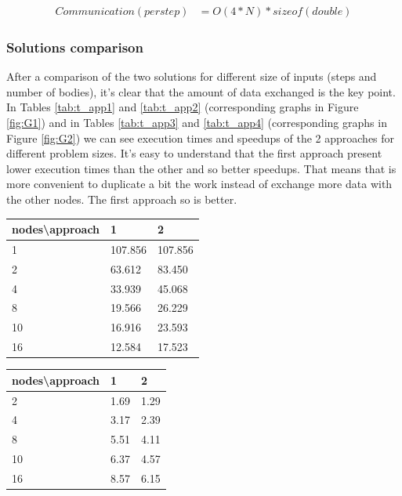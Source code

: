\documentclass[a4paper]{article}
\begin{document}
\begin{equation} \label{eq:com_app2}
\begin{split}
Communication (per step) & = O(4*N)*sizeof(double)
\end{split}
\end{equation}


\subsubsection{Solutions comparison}
\label{sec:sol_comp}
 
After a comparison of the two solutions for different size of inputs (steps and number of bodies), it's clear that the amount of data exchanged is the key point. In Tables \ref{tab:t_app1} and \ref{tab:t_app2} (corresponding graphs in Figure \ref{fig:G1}) and in Tables \ref{tab:t_app3} and \ref{tab:t_app4} (corresponding graphs in Figure \ref{fig:G2}) we can see execution times and speedups of the 2 approaches for different problem sizes. It's easy to understand that the first approach present lower execution times than the other and so better speedups. That means that is more convenient to duplicate a bit the work instead of exchange more data with the other nodes. The first approach so is better.
\\


\begin{minipage}[b]{.40\textwidth}
  \centering
  \begin{tabular}{l|l|l}
  \centering
nodes\textbackslash approach & 1 & 2 \\ \hline
1 & 107.856 & 107.856 \\ \hline
2 & 63.612 & 83.450 \\ \hline
4 & 33.939 & 45.068 \\ \hline
8 & 19.566 & 26.229 \\ \hline
10 & 16.916 & 23.593 \\ \hline
16 & 12.584 & 17.523 \\ 
    \hline
  \end{tabular}
  \label{tab:t_app1}
\end{minipage} \qquad
\begin{minipage}[b]{.40\textwidth}
  \centering
  \begin{tabular}{l|l|l}
nodes\textbackslash approach & 1 & 2 \\ \hline
2 & 1.69 & 1.29 \\ \hline
4 & 3.17 & 2.39 \\ \hline
8 & 5.51 & 4.11 \\ \hline
10 & 6.37 & 4.57 \\ \hline
16 & 8.57 & 6.15 \\ 
  \hline
  \end{tabular}
  \label{tab:t_app2}
\end{minipage}
\end{document}
